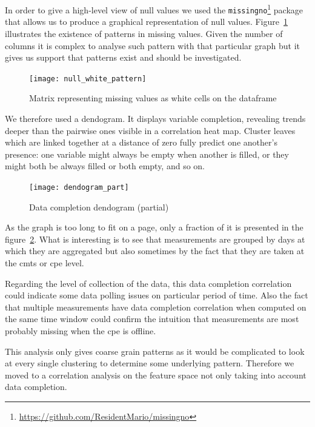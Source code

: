 In order to give a high-level view of null values we used the \texttt{missingno}\footnote{\url{https://github.com/ResidentMario/missingno}} package that allows us to produce a graphical representation of null values. Figure~\ref{white_matrix} illustrates the existence of patterns in missing values. Given the number of columns it is complex to analyse such pattern with that particular graph but it gives us support that patterns exist and should be investigated. 


\begin{figure}[ht]
    \begin{center}
    \texttt{[image: null\_white\_pattern]}
    \end{center}
    \caption{Matrix representing missing values as white cells on the dataframe}
    \label{white_matrix}
\end{figure}

We therefore used a dendogram. It displays variable completion, revealing trends deeper than the pairwise ones visible in a correlation heat map. Cluster leaves which are linked together at a distance of zero fully predict one another's presence: one variable might always be empty when another is filled, or they might both be always filled or both empty, and so on.

\begin{figure}[ht]
    \begin{center}
    \texttt{[image: dendogram\_part]}
    \end{center}
    \caption{Data completion dendogram (partial)}
    \label{dendogram}
\end{figure}

As the graph is too long to fit on a page, only a fraction of it is presented in the figure~\ref{dendogram}. What is interesting is to see that measurements are grouped by days at which they are aggregated but also sometimes by the fact that they are taken at the \acrshort{cmts} or \acrshort{cpe} level. 

Regarding the level of collection of the data, this data completion correlation could indicate some data polling issues on particular period of time. Also the fact that multiple measurements have data completion correlation when computed on the same time window could confirm the intuition that measurements are most probably missing when the \acrshort{cpe} is offline. 

This analysis only gives coarse grain patterns as it would be complicated to look at every single clustering to determine some underlying pattern. Therefore we moved to a correlation analysis on the feature space not only taking into account data completion. 

